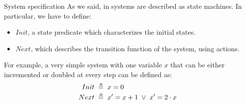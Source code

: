 \begin{frame}{System specification}
    As we said, in \tlap systems are described as state machines. In particular, we have to define:
    \begin{itemize}
        \item $Init$, a state predicate which characterizes the initial states.
        \item $Next$, which describes the transition function of the system, using actions.
    \end{itemize}
    \pause
    For example, a very simple system with one variable $x$ that can be either incremented or doubled at every step can be defined as:
    \begin{align*}
        Init &\;\mathrel{\smash {{\stackrel{\scriptscriptstyle\Delta}{=}}}}\; x = 0 \\
        Next &\;\mathrel{\smash {{\stackrel{\scriptscriptstyle\Delta}{=}}}}\; x' = x+1 \; \lor \; x' = 2 \cdot x\\
    \end{align*}
\end{frame}